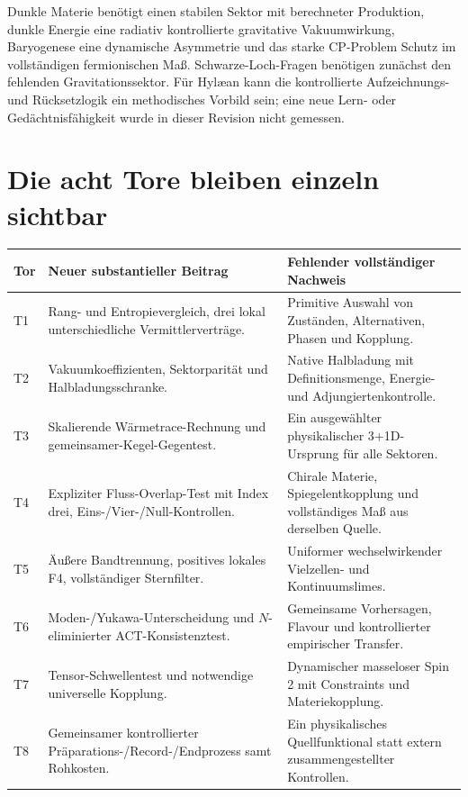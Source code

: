Dunkle Materie benötigt einen stabilen Sektor mit berechneter Produktion, dunkle Energie eine radiativ kontrollierte gravitative Vakuumwirkung, Baryogenese eine dynamische Asymmetrie und das starke CP-Problem Schutz im vollständigen fermionischen Maß. Schwarze-Loch-Fragen benötigen zunächst den fehlenden Gravitationssektor. Für Hylæan kann die kontrollierte Aufzeichnungs- und Rücksetzlogik ein methodisches Vorbild sein; eine neue Lern- oder Gedächtnisfähigkeit wurde in dieser Revision nicht gemessen.

\section{Die acht Tore bleiben einzeln sichtbar}
\begin{longtable}{L{10mm}L{65mm}L{72mm}}
\toprule Tor&Neuer substantieller Beitrag&Fehlender vollständiger Nachweis\\\midrule\endhead
T1&Rang- und Entropievergleich, drei lokal unterschiedliche Vermittlerverträge.&Primitive Auswahl von Zuständen, Alternativen, Phasen und Kopplung.\\
T2&Vakuumkoeffizienten, Sektorparität und Halbladungsschranke.&Native Halbladung mit Definitionsmenge, Energie- und Adjungiertenkontrolle.\\
T3&Skalierende Wärmetrace-Rechnung und gemeinsamer-Kegel-Gegentest.&Ein ausgewählter physikalischer 3+1D-Ursprung für alle Sektoren.\\
T4&Expliziter Fluss-Overlap-Test mit Index drei, Eins-/Vier-/Null-Kontrollen.&Chirale Materie, Spiegelentkopplung und vollständiges Maß aus derselben Quelle.\\
T5&Äußere Bandtrennung, positives lokales F4, vollständiger Sternfilter.&Uniformer wechselwirkender Vielzellen- und Kontinuumslimes.\\
T6&Moden-/Yukawa-Unterscheidung und $N$-eliminierter ACT-Konsistenztest.&Gemeinsame Vorhersagen, Flavour und kontrollierter empirischer Transfer.\\
T7&Tensor-Schwellentest und notwendige universelle Kopplung.&Dynamischer masseloser Spin 2 mit Constraints und Materiekopplung.\\
T8&Gemeinsamer kontrollierter Präparations-/Record-/Endprozess samt Rohkosten.&Ein physikalisches Quellfunktional statt extern zusammengestellter Kontrollen.\\\bottomrule
\end{longtable}

